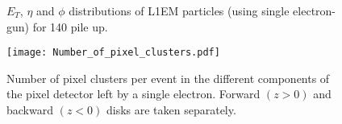 \documentclass[a4paper,12pt,oneside]{article}
\begin{document}
        \begin{figure}[!htb]
          \centering
          \caption{$E_{T}$, $\eta$ and $\phi$ distributions of L1EM particles (using single electron-gun) for 140 pile up.}
          \label{}
        \end{figure}

        \begin{figure}[!htb]
          \centering
          \texttt{[image: Number\_of\_pixel\_clusters.pdf]}
          \caption{Number of pixel clusters per event in the different components of the pixel detector left by a single electron.
            Forward $(z>0)$ and backward $(z<0)$ disks are taken separately.}
          \label{}
        \end{figure}


%
\end{document}

